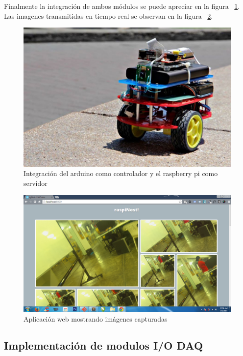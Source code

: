 Finalmente la integración de ambos módulos se puede apreciar en la figura ~\ref{fig:robot2}. Las imagenes transmitidas en tiempo real se observan en la figura ~\ref{fig:robot3}.

\begin{figure}[h!]
  \centering
  \includegraphics[scale=0.4]{images/activities/robot_movil/robot2.jpg}
  \caption{Integración del arduino como controlador y el raspberry pi como servidor}
  \label{fig:robot2}
\end{figure}

\begin{figure}[h!]
  \centering
  \includegraphics[scale=0.4]{images/activities/robot_movil/robot3.png}
  \caption{Aplicación web mostrando imágenes capturadas}
  \label{fig:robot3}
\end{figure}

\clearpage

\subsection{Implementación de modulos I/O DAQ}

